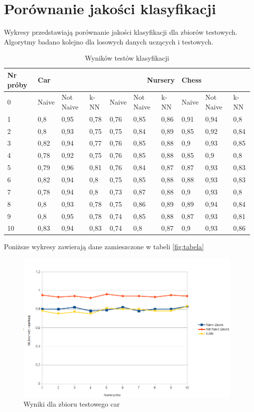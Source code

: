 \documentclass[paper=a4, fontsize=11pt]{scrartcl} %
\numberwithin{equation}{section} %
\numberwithin{figure}{section} %
\numberwithin{table}{section} %
\begin{document}
\section{Porównanie jakości klasyfikacji }

Wykresy przedstawiają porównanie jakości klasyfikacji dla zbiorów testowych. Algorytmy badano kolejno dla losowych danych uczących i testowych.

\begin{table}[t]
\caption{Wyników testów klasyfikacji}
\label{tabela}
\begin{tabular}{|l|l|l|l|l|l|l|l|l|l|}
  \hline 
  Nr próby & \multicolumn{3}{l|}{Car} & \multicolumn{3}{r|}{Nursery} & \multicolumn{3}{l|}{Chess} \\ \hline
  0 & Naive & Not Naive & k-NN  & Naive & Not Naive & k-NN & Naive & Not Naive & k-NN \\ \hline
  1 & 0,8 &	0,95 &0,78 &0,76	&0,85&0,86 & 0,91	&0,94	&0,8\\
  2 & 0,8 &	0,93 &0,75 &0,75&0,84&0,89&0,85&0,92	&0,84\\
  3 &0,82 & 0,94 &0,77&0,76&0,85&0,88&0,9&	0,93&	0,85\\
  4 &0,78 &	0,92	 &0,75&0,76&0,85&0,88&0,85&	0,9&	0,8\\
  5 &0,79 &	0,96 &0,81&0,76&	0,84&	0,87& 0,87&	0,93	&0,83\\
  6 &0,82 & 0,94	 &0,8&0,75&	0,85	&0,88&0,88&	0,93	&0,83\\
  7 &0,78 &	0,94 &0,8&0,73&	0,87	&0,88&0,9	&0,93	&0,8\\
  8 &0,8  &	0,93 &0,78&0,75&0,86&0,89&0,89	&0,94	&0,84\\
  9 &0,8 & 0,95 & 0,78&0,74&0,85&0,88&0,87&	0,93	&0,81\\
  10&0,83& 0,94 &0,83&0,74&0,8&0,87&0,9&	0,93	&0,86\\

  \hline
\end{tabular} 
\end{table}

Poniższe wykresy zawierają dane zamieszczone w tabeli \ref{fig:tabela}

\begin{figure}[h]
 \centering
\includegraphics[width=150mm]{car.png}
 \caption{Wyniki dla zbioru testowego car}
 \label{fig:model_drzewa}
\end{figure}
\end{document}
